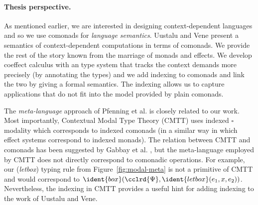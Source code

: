 
\paragraph{Thesis perspective.}
As mentioned earlier, we are interested in designing context-dependent languages and so we
use comonads for \emph{language semantics}. Uustalu and Vene present a semantics of
context-dependent computations in terms of comonads. We provide the rest of the story known
from the marriage of monads and effects. We develop coeffect calculus with an type system that
tracks the context demands more precisely (by annotating the types) and we add indexing
to comonads and link the two by giving a formal semantics. The indexing allows us to capture
applications that do not fit into the model provided by plain comonads.

The \emph{meta-language} approach of Pfenning et al. is closely related to
our work. Most importantly, Contextual Modal Type Theory (CMTT) uses indexed $\square$ modality
which corresponds to indexed comonads (in a similar way in which effect systems correspond to
indexed monads). The relation between CMTT and comonads has been suggested by
Gabbay et al. \cite{logic-cmtt-semantics}, but the meta-language employed by CMTT does not
directly correspond to comonadic operations. For example, our (\emph{letbox}) typing rule from
Figure~\ref{fig:modal-meta} is not a primitive of CMTT and would correspond to
$\ident{box}(\cclrd{\Psi}, \ident{letbox}(e_1, x, e_2))$. Nevertheless, the indexing in
CMTT provides a useful hint for adding indexing to the work of Uustalu and Vene.


%
%

